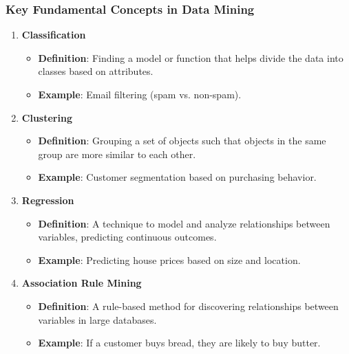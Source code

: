 \documentclass[aspectratio=169]{beamer}
\begin{document}
\begin{frame}[fragile]
    \frametitle{Key Fundamental Concepts in Data Mining}
    \begin{enumerate}
        \item \textbf{Classification}
        \begin{itemize}
            \item \textbf{Definition}: Finding a model or function that helps divide the data into classes based on attributes.
            \item \textbf{Example}: Email filtering (spam vs. non-spam).
        \end{itemize}

        \item \textbf{Clustering}
        \begin{itemize}
            \item \textbf{Definition}: Grouping a set of objects such that objects in the same group are more similar to each other.
            \item \textbf{Example}: Customer segmentation based on purchasing behavior.
        \end{itemize}

        \item \textbf{Regression}
        \begin{itemize}
            \item \textbf{Definition}: A technique to model and analyze relationships between variables, predicting continuous outcomes.
            \item \textbf{Example}: Predicting house prices based on size and location.
        \end{itemize}

        \item \textbf{Association Rule Mining}
        \begin{itemize}
            \item \textbf{Definition}: A rule-based method for discovering relationships between variables in large databases.
            \item \textbf{Example}: If a customer buys bread, they are likely to buy butter.
        \end{itemize}
    \end{enumerate}
\end{frame}
\end{document}
